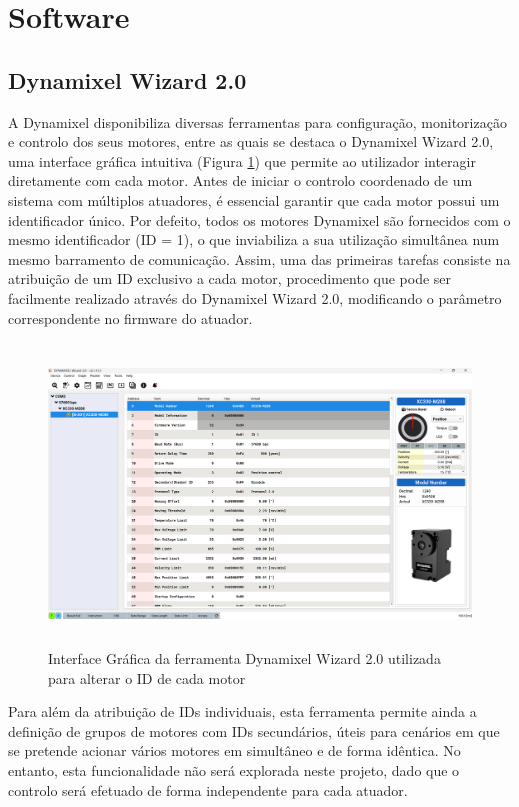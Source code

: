 \section{Software}

\subsection{Dynamixel Wizard 2.0}

A Dynamixel disponibiliza diversas ferramentas para configuração, monitorização e controlo dos seus motores, entre as quais se destaca o Dynamixel Wizard 2.0, uma interface gráfica intuitiva (Figura \ref{fig:dynamixel_wizard}) que permite ao utilizador interagir diretamente com cada motor. Antes de iniciar o controlo coordenado de um sistema com múltiplos atuadores, é essencial garantir que cada motor possui um identificador único. Por defeito, todos os motores Dynamixel são fornecidos com o mesmo identificador (ID = 1), o que inviabiliza a sua utilização simultânea num mesmo barramento de comunicação. Assim, uma das primeiras tarefas consiste na atribuição de um ID exclusivo a cada motor, procedimento que pode ser facilmente realizado através do Dynamixel Wizard 2.0, modificando o parâmetro correspondente no firmware do atuador.


\begin{figure}[H]
    \centering
    \includegraphics[height=8cm]{figs/chapter3/dynamixel_wizard.png}
    \caption{Interface Gráfica da ferramenta Dynamixel Wizard 2.0 utilizada para alterar o ID de cada motor}
    \label{fig:dynamixel_wizard}
    
\end{figure}


Para além da atribuição de IDs individuais, esta ferramenta permite ainda a definição de grupos de motores com IDs secundários, úteis para cenários em que se pretende acionar vários motores em simultâneo e de forma idêntica. No entanto, esta funcionalidade não será explorada neste projeto, dado que o controlo será efetuado de forma independente para cada atuador.

